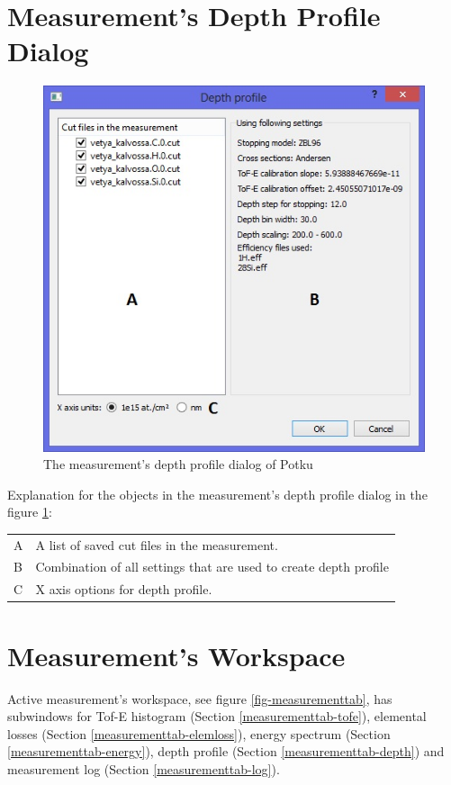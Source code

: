 \documentclass{scrreprt}
\begin{document}
\section{Measurement's Depth Profile Dialog}\label{measurement-dialogdepth}
\begin{figure}[H]
\centering
\includegraphics[scale=1]{measurement-dialogdepth}
\caption{The measurement's depth profile dialog of Potku}
\label{fig-dialogdepth}
\end{figure}
Explanation for the objects in the measurement's depth profile dialog in the figure \ref{fig-dialogdepth}:

\begin{tabular}{ll}
A & A list of saved cut files in the measurement.\\
B & Combination of all settings that are used to create depth profile\\
C & X axis options for depth profile.\\
\end{tabular}

\section{Measurement's Workspace}\label{measurementtab-content}
Active measurement's workspace, see figure \ref{fig-measurementtab}, has subwindows for Tof-E histogram (Section \ref{measurementtab-tofe}),
elemental losses (Section \ref{measurementtab-elemloss}), energy spectrum (Section \ref{measurementtab-energy}), 
depth profile (Section \ref{measurementtab-depth}) and measurement log (Section \ref{measurementtab-log}).
\end{document}
